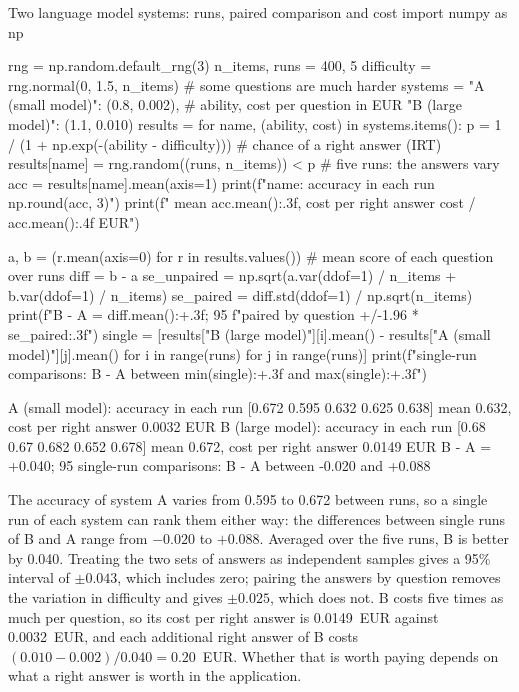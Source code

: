 \begin{pylisting}[label={lst:llmsystems}]{Two language model systems: runs, paired comparison and cost}
import numpy as np

rng = np.random.default_rng(3)
n_items, runs = 400, 5
difficulty = rng.normal(0, 1.5, n_items)           # some questions are much harder
systems = {"A (small model)": (0.8, 0.002),         # ability, cost per question in EUR
           "B (large model)": (1.1, 0.010)}
results = {}
for name, (ability, cost) in systems.items():
    p = 1 / (1 + np.exp(-(ability - difficulty)))   # chance of a right answer (IRT)
    results[name] = rng.random((runs, n_items)) < p  # five runs: the answers vary
    acc = results[name].mean(axis=1)
    print(f"{name}: accuracy in each run {np.round(acc, 3)}")
    print(f"  mean {acc.mean():.3f}, cost per right answer {cost / acc.mean():.4f} EUR")

a, b = (r.mean(axis=0) for r in results.values())   # mean score of each question over runs
diff = b - a
se_unpaired = np.sqrt(a.var(ddof=1) / n_items + b.var(ddof=1) / n_items)
se_paired = diff.std(ddof=1) / np.sqrt(n_items)
print(f"B - A = {diff.mean():+.3f}; 95%
      f"paired by question +/-{1.96 * se_paired:.3f}")
single = [results["B (large model)"][i].mean() - results["A (small model)"][j].mean()
          for i in range(runs) for j in range(runs)]
print(f"single-run comparisons: B - A between {min(single):+.3f} and {max(single):+.3f}")
\end{pylisting}
\begin{pyoutput}
A (small model): accuracy in each run [0.672 0.595 0.632 0.625 0.638]
  mean 0.632, cost per right answer 0.0032 EUR
B (large model): accuracy in each run [0.68  0.67  0.682 0.652 0.678]
  mean 0.672, cost per right answer 0.0149 EUR
B - A = +0.040; 95%
single-run comparisons: B - A between -0.020 and +0.088
\end{pyoutput}

The accuracy of system A varies from 0.595 to 0.672 between runs, so a single run of each system
can rank them either way: the differences between single runs of B and A range from $-0.020$ to
$+0.088$. Averaged over the five runs, B is better by 0.040. Treating the two sets of answers as
independent samples gives a 95\% interval of $\pm0.043$, which includes zero; pairing the
answers by question removes the variation in difficulty and gives $\pm0.025$, which does not. B
costs five times as much per question, so its cost per right answer is 0.0149~EUR against
0.0032~EUR, and each additional right answer of B costs $(0.010-0.002)/0.040=0.20$~EUR. Whether
that is worth paying depends on what a right answer is worth in the application.

